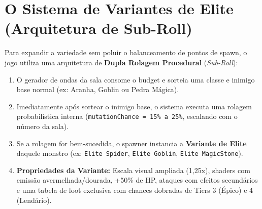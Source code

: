 \documentclass[a4paper,12pt]{report}
\begin{document}
\section{O Sistema de Variantes de Elite (Arquitetura de Sub-Roll)}
Para expandir a variedade sem poluir o balanceamento de pontos de spawn, o jogo utiliza uma arquitetura de \textbf{Dupla Rolagem Procedural} (\textit{Sub-Roll}):
\begin{enumerate}
    \item O gerador de ondas da sala consome o budget e sorteia uma classe e inimigo base normal (ex: Aranha, Goblin ou Pedra Mágica).
    \item Imediatamente após sortear o inimigo base, o sistema executa uma rolagem probabilística interna (\texttt{mutationChance = 15\% a 25\%}, escalando com o número da sala).
    \item Se a rolagem for bem-sucedida, o spawner instancia a \textbf{Variante de Elite} daquele monstro (ex: \texttt{Elite Spider}, \texttt{Elite Goblin}, \texttt{Elite MagicStone}).
    \item \textbf{Propriedades da Variante:} Escala visual ampliada (1,25x), shaders com emissão avermelhada/dourada, +50\% de HP, ataques com efeitos secundários e uma tabela de loot exclusiva com chances dobradas de Tiers 3 (Épico) e 4 (Lendário).
\end{enumerate}
\end{document}
